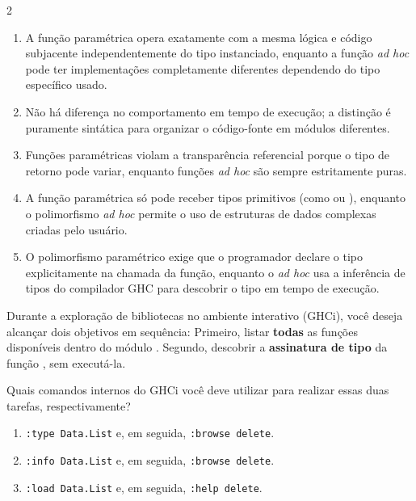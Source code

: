 \documentclass[a4paper,10pt,brazil]{article}
\begin{document}
\begin{multicols}{2}
\begin{enumerate}
  \item A função paramétrica opera exatamente com a mesma lógica e código subjacente independentemente do tipo instanciado, enquanto a função \emph{ad hoc} pode ter implementações completamente diferentes dependendo do tipo específico usado.

  \item Não há diferença no comportamento em tempo de execução; a distinção é puramente sintática para organizar o código-fonte em módulos diferentes.

  \item Funções paramétricas violam a transparência referencial porque o tipo de retorno pode variar, enquanto funções \emph{ad hoc} são sempre estritamente puras.

  \item A função paramétrica só pode receber tipos primitivos (como  ou ), enquanto o polimorfismo \emph{ad hoc} permite o uso de estruturas de dados complexas criadas pelo usuário.

  \item O polimorfismo paramétrico exige que o programador declare o tipo explicitamente na chamada da função, enquanto o \emph{ad hoc} usa a inferência de tipos do compilador GHC para descobrir o tipo em tempo de execução.


\end{enumerate}

Durante a exploração de bibliotecas no ambiente interativo (GHCi), você deseja alcançar dois objetivos em sequência:
Primeiro, listar \textbf{todas} as funções disponíveis dentro do módulo .
Segundo, descobrir a \textbf{assinatura de tipo} da função , sem executá-la.

Quais comandos internos do GHCi você deve utilizar para realizar essas duas tarefas, respectivamente?

\begin{enumerate}
  \item \texttt{:type Data.List} e, em seguida, \texttt{:browse delete}.

  \item \texttt{:info Data.List} e, em seguida, \texttt{:browse delete}.

  \item \texttt{:load Data.List} e, em seguida, \texttt{:help delete}.


\end{enumerate}
\end{multicols}
\end{document}
